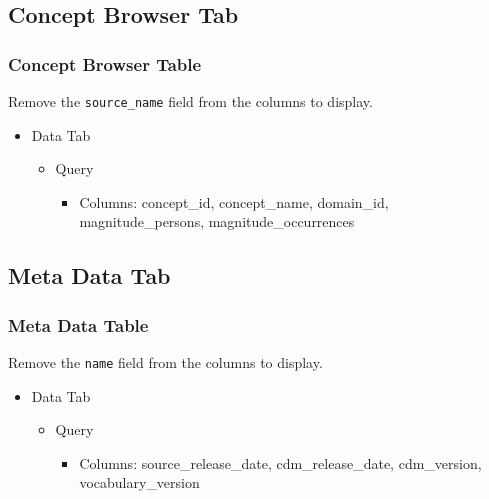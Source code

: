 \documentclass[
]{book}
\providecommand{\tightlist}{%
  \setlength{\itemsep}{0pt}\setlength{\parskip}{0pt}}
\begin{document}
\hypertarget{concept-browser-tab-1}{%
\subsection*{Concept Browser Tab}\label{concept-browser-tab-1}}

\hypertarget{concept-browser-table-1}{%
\subsubsection*{Concept Browser Table}\label{concept-browser-table-1}}

Remove the \texttt{source\_name} field from the columns to display.

\begin{itemize}
\tightlist
\item
  Data Tab

  \begin{itemize}
  \tightlist
  \item
    Query

    \begin{itemize}
    \tightlist
    \item
      Columns: concept\_id, concept\_name, domain\_id, magnitude\_persons, magnitude\_occurrences
    \end{itemize}
  \end{itemize}
\end{itemize}

\hypertarget{meta-data-tab-1}{%
\subsection*{Meta Data Tab}\label{meta-data-tab-1}}

\hypertarget{meta-data-table-1}{%
\subsubsection*{Meta Data Table}\label{meta-data-table-1}}

Remove the \texttt{name} field from the columns to display.

\begin{itemize}
\tightlist
\item
  Data Tab

  \begin{itemize}
  \tightlist
  \item
    Query

    \begin{itemize}
    \tightlist
    \item
      Columns: source\_release\_date, cdm\_release\_date, cdm\_version, vocabulary\_version
    \end{itemize}
  \end{itemize}
\end{itemize}

  
\end{document}
